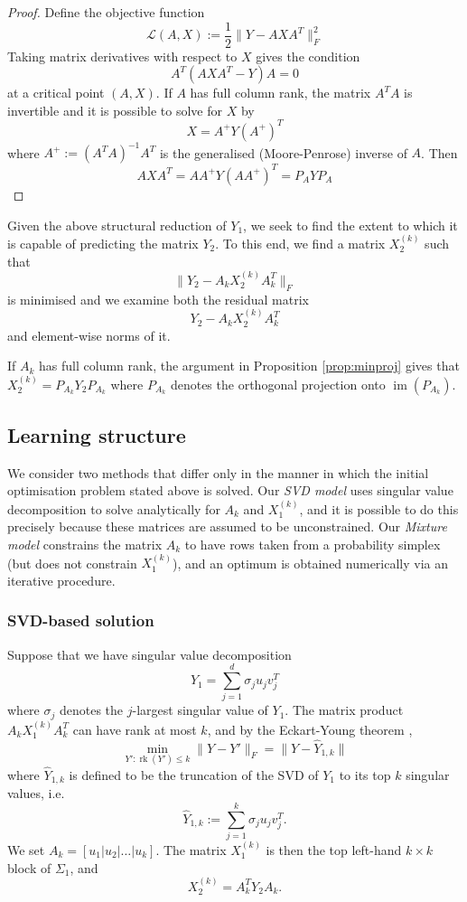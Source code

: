 \documentclass[a4]{article}
\newcommand{\curly}[1]{\mathcal{#1}}
\newcommand{\+}[1]{\mathbf{#1}}
\newcommand{\norm}[1]{\|#1\|}
\newcommand{\im}{\operatorname{im}}
\newcommand{\rk}{\operatorname{rk}}
\begin{document}
\begin{proof} Define the objective function 
\[ \curly{L}(A, X) := \frac{1}{2} \norm{Y - AXA^{T}}^{2}_{F} \] Taking matrix derivatives with respect to $X$ gives the condition
\[ A^{T}(AXA^{T} - Y)A  = 0 \] at a critical point $(A, X)$. If $A$ has full column rank, the matrix $A^{T}A$ is invertible and it is possible to solve for $X$ by
\[ X = A^{+}Y(A^{+})^{T} \] where $A^{+} := (A^{T}A)^{-1}A^{T}$ is the generalised (Moore-Penrose) inverse of $A$. Then
\[ AXA^{T} = AA^{+}Y(AA^{+})^{T} = P_{A}YP_{A} \]
\end{proof}

Given the above structural reduction of $Y_{1}$, we seek to find the extent to which it is capable of predicting the matrix $Y_{2}$. To this end, we find a matrix $X_{2}^{(k)}$ such that 
\[ \norm{Y_{2} - A_{k}X_{2}^{(k)}A_{k}^{T}}_{F} \] is minimised and we examine both the residual matrix 
\[ Y_{2} - A_{k}X_{2}^{(k)}A_{k}^{T} \] and element-wise norms of it. 

If $A_{k}$ has full column rank, the argument in Proposition \ref{prop:minproj} gives that $X_{2}^{(k)} = P_{A_{k}}Y_{2}P_{A_{k}}$ where $P_{A_{k}}$ denotes the orthogonal projection onto $\im(P_{A_{k}})$. 

\subsection{Learning structure}
\label{sec:learning}
We consider two methods that differ only in the manner in which the initial optimisation problem stated above is solved. Our \emph{SVD model} uses singular value decomposition to solve analytically for $A_{k}$ and $X^{(k)}_{1}$, and it is possible to do this precisely because these matrices are assumed to be unconstrained. Our \emph{Mixture model} constrains the matrix $A_{k}$ to have rows taken from a probability simplex (but does not constrain $X^{(k)}_{1}$), and an optimum is obtained numerically via an iterative procedure. 

\subsubsection{SVD-based solution}
Suppose that we have singular value decomposition 
\[ Y_{1} = \sum_{j = 1}^{d} \sigma_{j}u_{j}v_{j}^{T} \] where $\sigma_{j}$ denotes the $j$-largest singular value of $Y_{1}$. The matrix product $A_{k}X_{1}^{(k)}A_{k}^{T}$ can have rank at most $k$, and by the Eckart-Young theorem \cite{Eckartapproximationonematrix1936},
\[ \min_{Y': \rk(Y') \leq k} \norm{Y - Y'}_{F} = \norm{Y - \hat{Y}_{1,k}} \] where $\hat{Y}_{1,k}$ is defined to be the truncation of the SVD of $Y_{1}$ to its top $k$ singular values, i.e. 
\[ \hat{Y}_{1, k} := \sum_{j = 1}^{k} \sigma_{j}u_{j}v_{j}^{T}. \]
We set $A_{k} = [u_{1}|u_{2}| \dots| u_{k}]$. The matrix $X_{1}^{(k)}$ is then the top left-hand $k \times k$ block of $\Sigma_{1}$, and 
\[ X_{2}^{(k)} = A_{k}^{T}Y_{2}A_{k}. \] 
\end{document}
